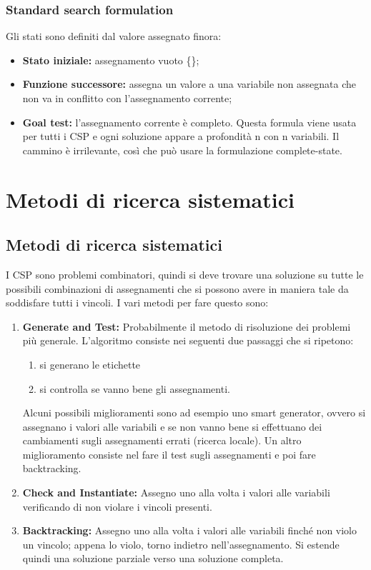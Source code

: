 \subsection{Standard search formulation}
Gli stati sono definiti dal valore assegnato finora:
\begin{itemize}
    \item \textbf{Stato iniziale: }assegnamento vuoto \{\};
    \item \textbf{Funzione successore: }assegna un valore a una variabile non
          assegnata che non va in conflitto con l'assegnamento corrente;
    \item \textbf{Goal test: }l'assegnamento corrente è completo. Questa formula
          viene usata per tutti i CSP e ogni soluzione appare a profondità n con n
          variabili. Il cammino è irrilevante, così che può usare la formulazione
          complete-state.
\end{itemize}


\chapter{Metodi di ricerca sistematici} \label{ch:Metodi di ricerca sistematici}
\section{Metodi di ricerca sistematici}
I CSP sono problemi combinatori, quindi si deve trovare una soluzione su tutte
le possibili combinazioni di assegnamenti che si possono avere in maniera tale
da soddisfare tutti i vincoli. I vari metodi per fare questo sono:
\begin{enumerate}
    \item \textbf{Generate and Test: }Probabilmente il metodo di risoluzione dei
          problemi più generale. L'algoritmo consiste nei seguenti due passaggi che si
          ripetono:
          \begin{enumerate}
              \item si generano le etichette
              \item si controlla se vanno bene gli assegnamenti.
          \end{enumerate}
          Alcuni possibili miglioramenti sono ad esempio uno smart generator,
          ovvero si assegnano i valori alle variabili e se non vanno bene si
          effettuano dei cambiamenti sugli assegnamenti errati (ricerca locale).
          Un altro miglioramento consiste nel fare il test sugli assegnamenti e
          poi fare backtracking.
    \item \textbf{Check and Instantiate: }Assegno uno alla volta i valori alle
          variabili verificando di non violare i vincoli presenti.
    \item \textbf{Backtracking:} Assegno uno alla volta i valori alle variabili
          finché non violo un vincolo; appena lo violo, torno indietro
          nell'assegnamento. Si estende quindi una soluzione parziale verso una
          soluzione completa.
\end{enumerate}



